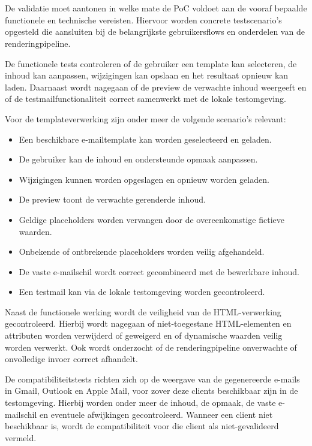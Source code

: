 \section{}%
\label{sec:testen}
De validatie moet aantonen in welke mate de PoC voldoet aan de vooraf
bepaalde functionele en technische vereisten. Hiervoor worden concrete
testscenario's opgesteld die aansluiten bij de belangrijkste gebruikersflows
en onderdelen van de renderingpipeline.

De functionele tests controleren of de gebruiker een template kan selecteren,
de inhoud kan aanpassen, wijzigingen kan opslaan en het resultaat opnieuw
kan laden. Daarnaast wordt nagegaan of de preview de verwachte inhoud
weergeeft en of de testmailfunctionaliteit correct samenwerkt met de lokale
testomgeving.

Voor de templateverwerking zijn onder meer de volgende scenario's relevant:

\begin{itemize}
    \item Een beschikbare e-mailtemplate kan worden geselecteerd en geladen.
    \item De gebruiker kan de inhoud en ondersteunde opmaak aanpassen.
    \item Wijzigingen kunnen worden opgeslagen en opnieuw worden geladen.
    \item De preview toont de verwachte gerenderde inhoud.
    \item Geldige placeholders worden vervangen door de overeenkomstige
    fictieve waarden.
    \item Onbekende of ontbrekende placeholders worden veilig afgehandeld.
    \item De vaste e-mailschil wordt correct gecombineerd met de bewerkbare
    inhoud.
    \item Een testmail kan via de lokale testomgeving worden gecontroleerd.
\end{itemize}

Naast de functionele werking wordt de veiligheid van de HTML-verwerking
gecontroleerd. Hierbij wordt nagegaan of niet-toegestane HTML-elementen
en attributen worden verwijderd of geweigerd en of dynamische waarden
veilig worden verwerkt. Ook wordt onderzocht of de renderingpipeline
onverwachte of onvolledige invoer correct afhandelt.

De compatibiliteitstests richten zich op de weergave van de gegenereerde
e-mails in Gmail, Outlook en Apple Mail, voor zover deze clients beschikbaar
zijn in de testomgeving. Hierbij worden onder meer de inhoud, de opmaak,
de vaste e-mailschil en eventuele afwijkingen gecontroleerd. Wanneer een
client niet beschikbaar is, wordt de compatibiliteit voor die client als
niet-gevalideerd vermeld.

